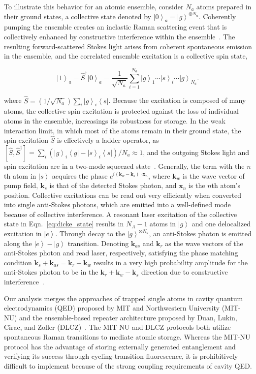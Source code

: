 \documentclass[aps,twocolumn,secnumarabic,amsmath,amssymb,pra,groupedaddress,
showpacs, showkeys]{revtex4-1}
\newcommand{\bra}[1]{\left\langle #1 \right|}
\newcommand{\ket}[1]{\left|#1\right\rangle}
\newcommand{\pna}[1]{\left(#1\right)}
\newcommand{\eqn}[1]{
\begin{equation}
	#1
\end{equation}
}
\begin{document}
To illustrate this behavior for an atomic ensemble, consider $N_a$ atoms
prepared in their ground states, a collective state denoted by
$\ket{0}_a=\ket{g}^{\otimes N_a}$. Coherently pumping the ensemble creates an
inelastic Raman scattering event that is collectively enhanced by constructive
interference within the ensemble~\cite{PhysRev.93.99}. The resulting
forward-scattered Stokes light arises from coherent spontaneous emission in the
ensemble, and the correlated ensemble excitation is a collective spin state,
\eqn{
\ket{1}_a = \hat{S}^{\dagger}\ket{0}_a=\frac{1}{\sqrt{N_a}}\sum_{i=1}^{N_a}\ket{g}_1\cdots\ket{s}_i\cdots\ket{g}_{N_a}.
\label{eq:dicke_state}
}
where $\hat{S}=(1/\sqrt{N_a})\sum_i\ket{g}_i\bra{s}$. Because the excitation is
composed of many atoms, the collective spin excitation is protected against the
loss of individual atoms in the ensemble, increasings its robustness for
storage. In the weak interaction limit, in which most of the atoms remain in
their ground state, the spin excitation $\hat{S}$ is effectively a ladder
operator, as $[\hat{S},\hat{S}^{\dagger}] =
\sum_i\pna{\ket{g}_i\bra{g}-\ket{s}_i\bra{s}}/N_a\approx 1$, and the outgoing
Stokes light and spin excitation are in a two-mode squeezed
state~\cite{nature35106500}. Generally, the term with the $n$th atom in
$\ket{s}$ acquires the phase $e^{i\pna{\mathbf{k}_w-\mathbf{k}_s}\cdot
  \mathbf{x}_n}$, where $\mathbf{k}_w$ is the wave vector of pump field,
$\mathbf{k}_s$ is that of the detected Stokes photon, and $\mathbf{x}_n$ is the
$n$th atom's position.  Collective excitations can be read out very efficiently
when converted into single anti-Stokes photons, which are emitted into a
well-defined mode because of collective interference. A resonant laser
excitation of the collective state in Eqn.~\ref{eq:dicke_state} results in
$N_A-1$ atoms in $\ket{g}$ and one delocalized excitation in $\ket{e}$. Through
decay to the $\ket{g}^{\otimes N_a}$, an anti-Stokes photon is emitted along
the $\ket{e}-\ket{g}$ transition. Denoting $\mathbf{k}_{as}$ and $\mathbf{k}_r$
as the wave vectors of the anti-Stokes photon and read laser, respectively,
satisfying the phase matching condition
$\mathbf{k}_{s}+\mathbf{k}_{as}=\mathbf{k}_{r}+\mathbf{k}_{w}$ results in a
very high probability amplitude for the anti-Stokes photon to be in the
$\mathbf{k}_{r}+\mathbf{k}_{w}-\mathbf{k}_{s}$ direction due to constructive
interference~\cite{PhysRevLett.103.043601}. 

Our analysis merges the approaches of trapped single atoms in cavity quantum
electrodynamics (QED) proposed by MIT and Northwestern University (MIT-NU) and
the ensemble-based repeater architecture proposed by Duan, Lukin, Cirac, and
Zoller (DLCZ)~\cite{PhysRevLett.87.167903,nature35106500}. The MIT-NU and DLCZ
protocols both utilize spontaneous Raman transitions to mediate atomic
storage. Whereas the MIT-NU protocol has the advantage of storing externally
generated entanglement and verifying its success through cycling-transition
fluorescence, it is prohibitively difficult to implement because of the strong
coupling requirements of cavity QED. 
\end{document}
